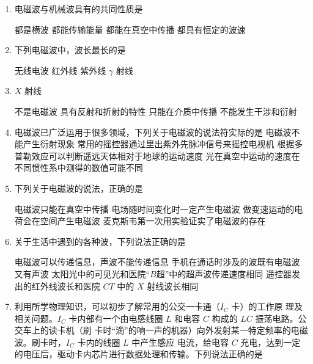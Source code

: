 
\begin{enumerate}
	\item
{}
电磁波与机械波具有的共同性质是  

\fourchoices
{都是横波}
{都能传输能量}
{都能在真空中传播}
{都具有恒定的波速}


\item
{}
下列电磁波中，波长最长的是  

\fourchoices
{无线电波}
{红外线}
{紫外线}
{$ \gamma $ 射线}



\item 
{}
 $ X $ 射线  
 

\fourchoices
{不是电磁波}
{具有反射和折射的特性}
{只能在介质中传播}
{不能发生干涉和衍射}


\item 
{}
电磁波已广泛运用于很多领域，下列关于电磁波的说法符实际的是  
\fourchoices
{电磁波不能产生衍射现象}
{常用的摇控器通过里出紫外先脉冲信号来摇控电视机}
{根据多普勒效应可以判断遥远天体相对于地球的运动速度}
{光在真空中运动的速度在不同惯性系中测得的数值可能不同}


\item 
{}
下列关于电磁波的说法，正确的是  


\fourchoices
{电磁波只能在真空中传播}
{电场随时间变化时一定产生电磁波}
{做变速运动的电荷会在空间产生电磁波}
{麦克斯韦第一次用实验证实了电磁波的存在}



\item 
{}
关于生活中遇到的各种波，下列说法正确的是  

\fourchoices
{电磁波可以传递信息，声波不能传递信息}
{手机在通话时涉及的波既有电磁波又有声波}
{太阳光中的可见光和医院“$ B $超”中的超声波传递速度相同}
{遥控器发出的红外线波长和医院 $ CT $ 中的 $ X $ 射线波长相同}



\item 
{}
利用所学物理知识，可以初步了解常用的公交一卡通（$ I_{C} $ 卡）的工作原
理及相关问题。$ I_{C} $ 卡内部有一个由电感线圈 $ L $ 和电容 $ C $ 构成的 $ LC $ 振荡电路。公交车上的读卡机（刷
卡时“滴”的响一声的机器）向外发射某一特定频率的电磁波。刷卡时，$ I_{C} $ 卡内的线圈 $ L $ 中产生感应
电流，给电容 $ C $ 充电，达到一定的电压后，驱动卡内芯片进行数据处理和传输。下列说法正确的是  


\end{enumerate}
